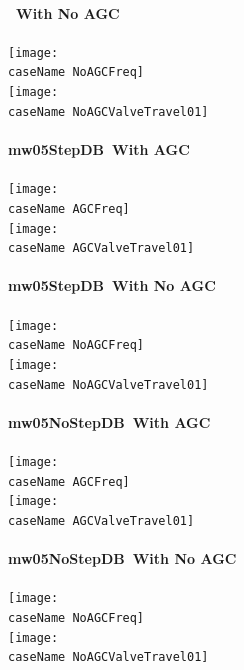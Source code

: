 \documentclass[12pt]{article}
\newcommand{\caseName}{ }
\begin{document}
\paragraph{\caseName\ With No AGC} 
\begin{center}
	\texttt{[image: \\caseName NoAGCFreq]} \\
	\texttt{[image: \\caseName NoAGCValveTravel01]} 
\end{center}
\pagebreak

\renewcommand{\caseName}{mw05StepDB}
\paragraph{\caseName\ With AGC} 
\begin{center}
	\texttt{[image: \\caseName AGCFreq]}\\
	\texttt{[image: \\caseName AGCValveTravel01]} \\
\end{center}
\paragraph{\caseName\ With No AGC} 
\begin{center}
	\texttt{[image: \\caseName NoAGCFreq]} \\
	\texttt{[image: \\caseName NoAGCValveTravel01]} 
\end{center}
\pagebreak

\renewcommand{\caseName}{mw05NoStepDB}
\paragraph{\caseName\ With AGC} 
\begin{center}
	\texttt{[image: \\caseName AGCFreq]}\\
	\texttt{[image: \\caseName AGCValveTravel01]} \\
\end{center}
\paragraph{\caseName\ With No AGC} 
\begin{center}
	\texttt{[image: \\caseName NoAGCFreq]} \\
	\texttt{[image: \\caseName NoAGCValveTravel01]} 
\end{center}
\pagebreak
\end{document}
